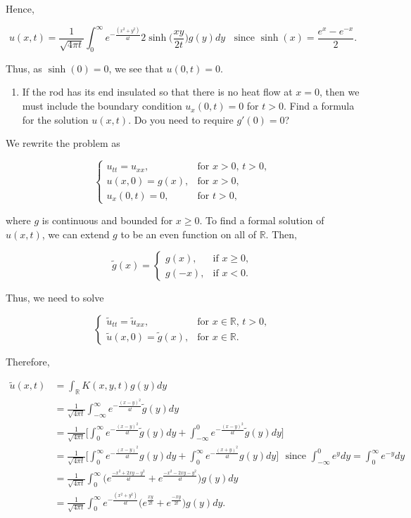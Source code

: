 \documentclass{article}
\begin{document}
Hence, 

$$u(x,t) = \frac{1}{\sqrt{4\pi t}}\int_{0}^{\infty}e^{-\frac{(x^2+y^2)}{4t}}2\sinh{\Big(\frac{xy}{2t}\Big)}g(y)dy ~~~~ \text{since  $\sinh(x)=\frac{e^x-e^{-x}}{2}$}.$$

Thus, as $\sinh(0)=0$, we see that $u(0,t)=0$.


\begin{enumerate}[label=(\alph*),start=2]
    \item If the rod has its end insulated so that there is no heat flow at $x=0$, then we must include the boundary condition $u_x(0,t)=0$ for $t>0$. Find a formula for the solution $u(x,t)$. Do you need to require $g'(0)=0$?
\end{enumerate}

We rewrite the problem as

\[
  \begin{cases}
  u_{tt}=u_{xx},  &\text{for $x>0$, $t>0$}, \\
  u(x,0)=g(x),& \text{for $x>0$}, \\
  u_x(0,t)=0, &\text{for $t>0$},
  \end{cases}
\]

where $g$ is continuous and bounded for $x\geq 0$. To find a formal solution of $u(x,t)$, we can extend $g$ to be an even function on all of $\mathbb R$. Then,

\[
  \tilde{g}(x) =
  \begin{cases}
    g(x), & \text{if $x\geq 0$}, \\
    g(-x), & \text{if $x < 0$}.
  \end{cases}
\]

Thus, we need to solve

\[
  \begin{cases}
  \tilde{u}_{tt}=\tilde{u}_{xx},  &\text{for $x\in\mathbb R$, $t>0$}, \\
  \tilde{u}(x,0)=\tilde{g}(x),& \text{for $x\in\mathbb R$}.
  \end{cases}
\]

Therefore,

\begin{equation*}
\begin{split}
\tilde{u}(x,t) &= \int_{\mathbb R}K(x,y,t)g(y)dy \\&=\frac{1}{\sqrt{4\pi t}}\int_{-\infty}^{\infty} e^{-\frac{(x-y)^2}{4t}}\tilde{g}(y)dy \\ &=
\frac{1}{\sqrt{4\pi t}}\Bigg[\int_{0}^{\infty} e^{-\frac{(x-y)^2}{4t}}\tilde{g}(y)dy +
\int_{-\infty}^{0} e^{-\frac{(x-y)^2}{4t}}\tilde{g}(y)dy\Bigg]\\ &=
\frac{1}{\sqrt{4\pi t}}\Bigg[\int_{0}^{\infty} e^{-\frac{(x-y)^2}{4t}}g(y)dy +
\int_{0}^{\infty} e^{-\frac{(x+y)^2}{4t}}g(y)dy\Bigg]~~~\text{since $\int_{-\infty}^{0}e^ydy=\int_{0}^{\infty}e^{-y}dy$}\\&=
\frac{1}{\sqrt{4\pi t}}\int_{0}^{\infty}\Bigg( e^{\frac{-x^2+2xy-y^2}{4t}} + e^{\frac{-x^2-2xy-y^2}{4t}}\Bigg)g(y)dy \\&=
\frac{1}{\sqrt{4\pi t}}\int_{0}^{\infty}e^{-\frac{(x^2+y^2)}{4t}}\Big(e^{\frac{xy}{2t}}+e^{\frac{-xy}{2t}}\Big)g(y)dy.
\end{split}
\end{equation*}
\end{document}
